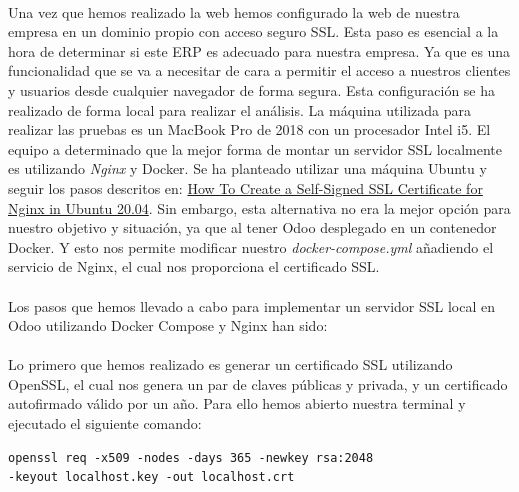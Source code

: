 \paragraph{}
Una vez que hemos realizado la web hemos configurado la web de nuestra empresa en un dominio propio con acceso seguro SSL. Esta paso es esencial a la hora de determinar si este ERP es adecuado para nuestra empresa. Ya que es una funcionalidad que se va a necesitar de cara a permitir el acceso a nuestros clientes y usuarios desde cualquier navegador de forma segura. Esta configuración se ha realizado de forma local para realizar el análisis. La máquina utilizada para realizar las pruebas es un MacBook Pro de 2018 con un procesador Intel i5. El equipo a determinado que la mejor forma de montar un servidor SSL localmente es utilizando \textit{Nginx} y Docker. Se ha planteado utilizar una máquina Ubuntu y seguir los pasos descritos en: \href{https://www.digitalocean.com/community/tutorials/how-to-create-a-self-signed-ssl-certificate-for-nginx-in-ubuntu-20-04-1}{How To Create a Self-Signed SSL Certificate for Nginx in Ubuntu 20.04}. Sin embargo, esta alternativa no era la mejor opción para nuestro objetivo y situación, ya que al tener Odoo desplegado en un contenedor Docker. Y esto nos permite modificar nuestro \textit{docker-compose.yml} añadiendo el servicio de Nginx, el cual nos proporciona el certificado SSL. 

\paragraph{}
Los pasos que hemos llevado a cabo para implementar un servidor SSL local en Odoo utilizando Docker Compose y Nginx han sido:
\paragraph{}
Lo primero que hemos realizado es generar un certificado SSL utilizando OpenSSL, el cual nos genera un par de claves públicas y privada, y un certificado autofirmado válido por un año. Para ello hemos abierto nuestra terminal y ejecutado el siguiente comando:

 \begin{lstlisting}[frame=single, basicstyle=\small]
openssl req -x509 -nodes -days 365 -newkey rsa:2048
-keyout localhost.key -out localhost.crt
\end{lstlisting}
